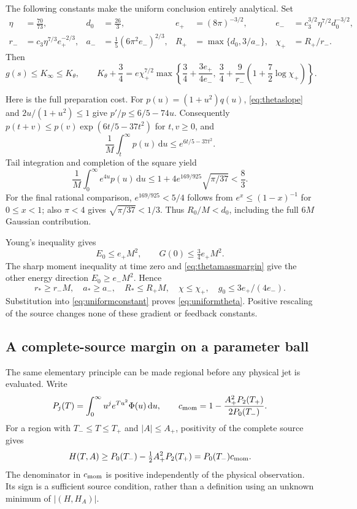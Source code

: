 \documentclass[11pt]{article}
\numberwithin{equation}{section}
\newcommand{\dd}{\,\mathrm d}
\begin{document}
The following constants make the uniform conclusion entirely
analytical. Set
\begin{align}
 \eta&=\frac{70}{73},&
 d_0&=\frac{26}{3},&
 e_+&=(8\pi)^{-3/2},&
 e_-&=c_3^{3/2}\eta^{7/2}d_0^{-3/2},\nonumber\\
 r_-&=c_3\eta^{7/3}e_+^{-2/3},&
 a_-&=\frac15(6\pi^2e_-)^{2/3},&
 R_+&=\max\{d_0,3/a_-\},&
 \chi_+&=R_+/r_-.\label{eq:thetabudgets}
\end{align}
Then
\begin{equation}\label{eq:uniformtheta}
 g(s)\le K_\infty\le K_\theta,\qquad
 K_\theta+\frac34=e\chi_+^{7/2}
 \max\left\{\frac34+\frac{3e_+}{4e_-},\
 \frac34+\frac9{r_-}\left(1+\frac72\log\chi_+\right)\right\}.
\end{equation}

Here is the full preparation cost. For $p(u)=(1+u^2)q(u)$,
\eqref{eq:thetaslope} and $2u/(1+u^2)\le1$ give
$p'/p\le6/5-74u$. Consequently
$p(t+v)\le p(v)\exp(6t/5-37t^2)$ for $t,v\ge0$, and
\[
 \frac1M\int_t^\infty p(u)\dd u\le e^{6t/5-37t^2}.
\]
Tail integration and completion of the square yield
\[
 \frac1M\int_0^\infty e^{4u}p(u)\dd u
 \le1+4e^{169/925}\sqrt{\pi/37}<\frac83.
\]
For the final rational comparison, $e^{169/925}<5/4$ follows from
$e^x\le(1-x)^{-1}$ for $0\le x<1$; also $\pi<4$ gives
$\sqrt{\pi/37}<1/3$. Thus $R_0/M<d_0$, including the full $6M$
Gaussian contribution.

Young's inequality gives
\[
 E_0\le e_+M^2,\qquad G(0)\le\tfrac34e_+M^2.
\]
The sharp moment inequality at time zero and
\eqref{eq:thetamassmargin} give the other energy direction
$E_0\ge e_-M^2$. Hence
\[
 r_*\ge r_-M,\quad a_*\ge a_-,\quad R_*\le R_+M,\quad
 \chi\le\chi_+,\quad g_0\le3e_+/(4e_-).
\]
Substitution into \eqref{eq:uniformconstant} proves
\eqref{eq:uniformtheta}. Positive rescaling of the source changes none
of these gradient or feedback constants.

\subsection{A complete-source margin on a parameter ball}
\label{fcg:momentsection}

The same elementary principle can be made regional before any physical
jet is evaluated. Write
\[
 P_j(T)=\int_0^\infty u^j e^{Tu^2}\Phi(u)\dd u,
 \qquad
 c_{\rm mom}=1-\frac{A_+^2P_2(T_+)}{2P_0(T_-)}.
\]
For a region with $T_-\le T\le T_+$ and $|A|\le A_+$,
positivity of the complete source gives
\begin{equation}\label{fcg:momentmargin}
 H(T,A)\ge P_0(T_-)-\tfrac12 A_+^2P_2(T_+)
             =P_0(T_-)c_{\rm mom}.
\end{equation}
The denominator in $c_{\rm mom}$ is positive independently of the
physical observation. Its sign is a sufficient source condition, rather
than a definition using an unknown minimum of $|(H,H_A)|$.
\end{document}
